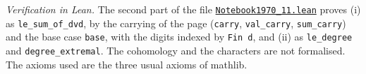 \emph{Verification in Lean.} The second part of the file \href{\leanblobmain/Notebook1970_11.lean}{\texttt{Notebook1970\_11.\allowbreak{}lean}} proves (i) as \texttt{le\_sum\_of\_dvd}, by the carrying of the page (\texttt{carry}, \texttt{val\_carry}, \texttt{sum\_carry}) and the base case \texttt{base}, with the digits indexed by \texttt{Fin d}, and (ii) as \texttt{le\_degree} and \texttt{degree\_extremal}. The cohomology and the characters are not formalised. The axioms used are the three usual axioms of mathlib.

